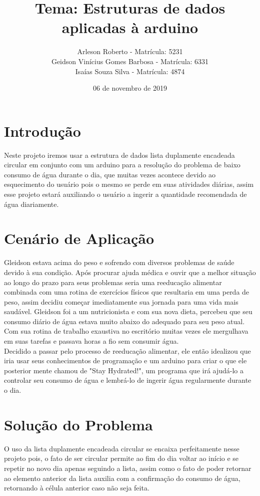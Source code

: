 \documentclass[a4paper]{article}
\title{Tema: Estruturas de dados aplicadas à arduino}
\author{Arleson Roberto - Matrícula: 5231  \\ Geidson Vinícius Gomes Barbosa - Matrícula: 6331 \\ Isaías Souza Silva - Matrícula: 4874 }
\date{06 de novembro de 2019}
\begin{document}
\maketitle

\section{Introdução}
Neste projeto iremos usar a estrutura de dados lista duplamente encadeada circular em conjunto com um arduino para a resolução do problema de baixo consumo de água durante o dia, que muitas vezes acontece devido ao esquecimento do usuário pois o mesmo se perde em suas atividades diárias, assim esse projeto estará auxiliando o usuário a ingerir a quantidade recomendada de água diariamente.

\section{Cenário de Aplicação}
Gleidson estava acima do peso e sofrendo com diversos problemas de saúde devido à sua condição. Após procurar ajuda médica e ouvir que a melhor situação ao longo do prazo para seus problemas seria uma reeducação alimentar combinada com uma rotina de exercícios físicos que resultaria em uma perda de peso, assim decidiu começar imediatamente sua jornada para uma vida mais saudável. Gleidson foi a um nutricionista e com sua nova dieta, percebeu que seu consumo diário de água estava muito abaixo do adequado para seu peso atual. Com sua rotina de trabalho exaustiva no escritório muitas vezes ele mergulhava em suas tarefas e passava horas a fio sem consumir água.\\Decidido a passar pelo processo de reeducação alimentar, ele então idealizou que iria usar seus conhecimentos de programação e um arduino para criar o que ele posterior mente chamou de "Stay Hydrated!", um programa que irá ajudá-lo a controlar seu consumo de água e lembrá-lo de ingerir água regularmente durante o dia. 


\section{Solução do Problema}
O uso da lista duplamente encadeada circular se encaixa perfeitamente nesse projeto pois, o fato de ser circular permite ao fim do dia voltar ao início e se repetir no novo dia apenas seguindo a lista, assim como o fato de poder retornar ao elemento anterior da lista auxilia com a confirmação do consumo de água, retornando à célula anterior caso não seja feita.
\end{document}
